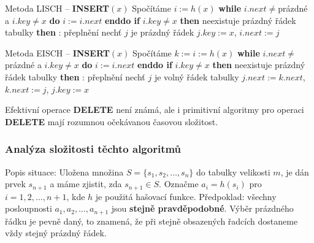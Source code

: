 \documentclass[a4paper,12pt]{article}
\begin{document}
Metoda LISCH -- {\bf INSERT$(x)$}\newline 
Spočítáme $i:=h(x)$\newline 
{\bf while} $i.next\ne$prázdné a $i.key\ne x$ {\bf do} $i:=i.
next$ {\bf enddo \newline 
if} $i.key\ne x$ {\bf then}\newline 
\phantom{---}{\bf if} neexistuje prázdný řádek tabulky {\bf then}\newline 
\phantom{------}{\bf Výstup}: přeplnění\newline 
\phantom{---}{\bf else}\newline 
\phantom{------}nechť $j$ je prázdný řádek $j.
key:=x$, 
$i.next:=j$\newline 
\phantom{---}{\bf endif\newline 
endif}


Metoda EISCH -- {\bf INSERT$(x)$}\newline 
Spočítáme $k:=i:=h(x)$\newline 
{\bf while} $i.next\ne$prázdné a $i.key\ne x$ {\bf do} $i:=i.
next$ {\bf enddo \newline 
if} $i.key\ne x$ {\bf then}\newline 
\phantom{---}{\bf if} neexistuje prázdný řádek tabulky {\bf then}\newline 
\phantom{------}{\bf Výstup}: přeplnění\newline 
\phantom{---}{\bf else}\newline 
\phantom{------}nechť $j$ je volný řádek tabulky\newline 
\phantom{------}$j.next:=k.next$, $k.next:=j$, $j.key:=x$\newline 
\phantom{---}{\bf endif\newline 
endif}


Efektivní operace {\bf DELETE}  není známá, ale i primitivní 
algoritmy pro operaci {\bf DELETE} mají rozumnou očekávanou 
časovou složitost.

\subsubsection{Analýza složitosti těchto algoritmů}

Popis situace: Uložena množina 
$S=\{s_1,s_2,\dots,s_n\}$ do ta\-bulky velikosti $m$, je dán 
prvek $s_{n+1}$ a máme zjistit, zda $s_{n+1}\in S$. Označme 
$a_i=h(s_i)$ pro $i=1,2,\dots,n+1$, kde $h$ je použitá hašovací 
funkce.\newline 
Předpoklad: všechny posloupnosti $a_1,a_2,\dots,a_{n+1}$ jsou 
{\bf stejně pravděpodobné}. Výběr prázdného řádku je 
pevně daný, to znamená, že při stejně obsazených 
řadcích dostaneme vždy stejný prázdný řádek.  
\end{document}
